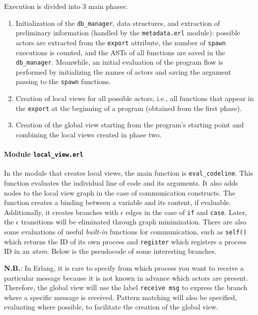 Execution is divided into 3 main phases:
\begin{enumerate}
    \item Initialization of the \texttt{db\_manager}, data structures, and extraction of preliminary information (handled by the \texttt{metadata.erl} module): possible actors are extracted from the \texttt{export} attribute, the number of \texttt{spawn} executions is counted, and the ASTs of all functions are saved in the \texttt{db\_manager}. Meanwhile, an initial evaluation of the program flow is performed by initializing the names of actors and saving the argument passing to the \texttt{spawn} functions.
    \item Creation of local views for all possible actors, i.e., all functions that appear in the \texttt{export} at the beginning of a program (obtained from the first phase).
    \item Creation of the global view starting from the program's starting point and combining the local views created in phase two.
\end{enumerate}


\paragraph{Module \texttt{local\_view.erl}}
In the module that creates local views, the main function is \texttt{eval\_codeline}. This function evaluates the individual line of code and its arguments. It also adds nodes to the local view graph in the case of communication constructs. The function creates a binding between a variable and its content, if evaluable. Additionally, it creates branches with $\epsilon$ edges in the case of \texttt{if} and \texttt{case}. Later, the $\epsilon$ transitions will be eliminated through graph minimization. There are also some evaluations of useful \textit{built-in} functions for communication, such as \texttt{self()} which returns the ID of its own process and \texttt{register} which registers a process ID in an \textit{atom}.
Below is the pseudocode of some interesting branches.

\textbf{N.B.}: In Erlang, it is rare to specify from which process you want to receive a particular message because it is not known in advance which actors are present. Therefore, the global view will use the label \texttt{receive msg} to express the branch where a specific message is received. Pattern matching will also be specified, evaluating where possible, to facilitate the creation of the global view.

